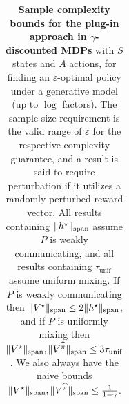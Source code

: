 \documentclass{article}
\theoremstyle{plain}
\theoremstyle{plain}
\theoremstyle{remark}
\theoremstyle{plain}
\theoremstyle{plain}
\newcommand{\Vhat}{\widehat{V}}
\newcommand{\pihat}{\widehat{\pi}}
\newcommand{\Otilde}{\widetilde{O}}
\newcommand{\tmix}{\tau_{\mathrm{unif}}}
\newcommand\cig[1]{\scalerel*[5.5pt]{\Big#1}{%
  \ensurestackMath{\addstackgap[1.5pt]{\big#1}}}}
\newcommand\cigl[1]{\mathopen{\cig{#1}}}
\newcommand\cigr[1]{\mathclose{\cig{#1}}}
\newcommand{\plugin}{plug-in\xspace}
\begin{document}
\begin{table}[t]
{\begin{tabular}{cccc}
\end{tabular}
\caption{\textbf{Sample complexity bounds for the \plugin approach in $\gamma$-discounted MDPs} with $S$ states and $A$ actions, for finding an $\varepsilon$-optimal policy under a generative model (up to $\log$ factors). The sample size requirement is the valid range of $\varepsilon$ for the respective complexity guarantee, and a result is said to require perturbation if it utilizes a randomly perturbed reward vector. All results containing $\Vert h^\star\Vert _{\textnormal{span}}$ assume $P$ is weakly communicating, and all results containing $\tmix$ assume uniform mixing. If $P$ is weakly communicating then $\Vert V^\star\Vert _{\textnormal{span}} \leq 2 \Vert h^\star\Vert _{\textnormal{span}}$, and if $P$ is uniformly mixing then $\spannorm{V^\star}, \spannorm{V^{\pihat}} \leq 3 \tmix$. We also always have the naive bounds $\spannorm{V^\star}, \spannorm{V^{\pihat}} \leq \frac{1}{1-\gamma}$.}
\label{table:DMDPs}
}
\end{table}
\end{document}
